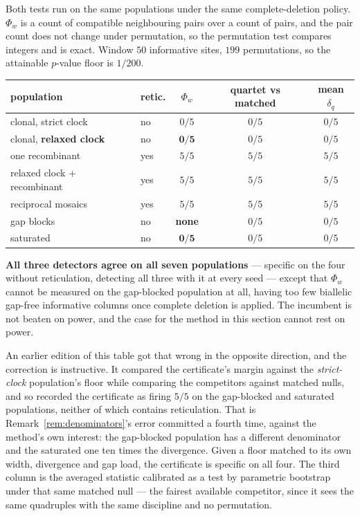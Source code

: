 \begin{numerics}
Both tests run on the same populations under the same complete-deletion policy.
$\Phi_w$ is a count of compatible neighbouring pairs over a count of pairs, and
the pair count does not change under permutation, so the permutation test
compares integers and is exact. Window $50$ informative sites, $199$
permutations, so the attainable $p$-value floor is $1/200$.

\begin{center}\footnotesize
\begin{tabular}{@{}llccc@{}}
\toprule
population & retic. & $\Phi_w$ & quartet vs matched & mean $\delta_q$ \\
\midrule
clonal, strict clock          & no  & $0/5$ & $0/5$ & $0/5$ \\
clonal, \textbf{relaxed clock} & no  & $\mathbf{0/5}$ & $0/5$ & $0/5$ \\
one recombinant               & yes & $5/5$ & $5/5$ & $5/5$ \\
relaxed clock + recombinant   & yes & $5/5$ & $5/5$ & $5/5$ \\
reciprocal mosaics            & yes & $5/5$ & $5/5$ & $5/5$ \\
gap blocks                    & no  & \textbf{none} & $0/5$ & $0/5$ \\
saturated                     & no  & $\mathbf{0/5}$ & $0/5$ & $0/5$ \\
\bottomrule
\end{tabular}
\end{center}

\textbf{All three detectors agree on all seven populations} --- specific on the
four without reticulation, detecting all three with it at every seed --- except
that $\Phi_w$ cannot be measured on the gap-blocked population at all, having too
few biallelic gap-free informative columns once complete deletion is applied. The
incumbent is not beaten on power, and the case for the method in this section
cannot rest on power.

An earlier edition of this table got that wrong in the opposite direction, and
the correction is instructive. It compared the certificate's margin against the
\emph{strict-clock} population's floor while comparing the competitors against
matched nulls, and so recorded the certificate as firing $5/5$ on the gap-blocked
and saturated populations, neither of which contains reticulation. That is
Remark~\ref{rem:denominators}'s error committed a fourth time, against the
method's own interest: the gap-blocked population has a different denominator and
the saturated one ten times the divergence. Given a floor matched to its own
width, divergence and gap load, the certificate is specific on all four. The
third column is the averaged statistic calibrated as a test by parametric
bootstrap under that same matched null --- the fairest available competitor, since
it sees the same quadruples with the same discipline and no permutation.


\end{numerics}
